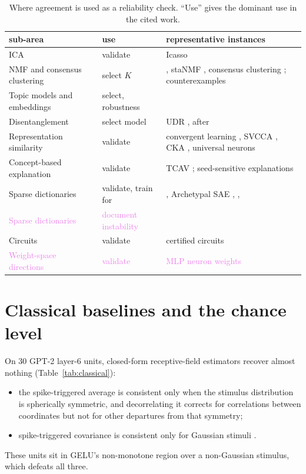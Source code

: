 \documentclass[10pt]{article}
\newcommand{\draft}[1]{\textcolor{violet}{#1}}
\begin{document}
\begin{table}[h]
\centering
\scriptsize
\begin{tabular}{p{3.7cm}p{2.1cm}p{7.6cm}}
\toprule
sub-area & use & representative instances \\
\midrule
ICA & validate & Icasso \citep{himberg2004icasso} \\
NMF and consensus clustering & select $K$ & \citet{brunet2004metagenes}, staNMF
\citep{wu2016stanmf}, consensus clustering \citep{monti2003consensus}; counterexamples
\citep{kotliar2019cnmf,senbabaoglu2014critical} \\
Topic models and embeddings & select, robustness & \citet{greene2014topics,antoniak2018stability} \\
Disentanglement & select model & UDR \citep{duan2020udr}, after \citet{locatello2019challenging} \\
Representation similarity & validate & convergent learning \citep{li2016convergent}, SVCCA
\citep{raghu2017svcca}, CKA \citep{kornblith2019cka}, universal neurons
\citep{gurnee2024universal} \\
Concept-based explanation & validate & TCAV \citep{kim2018tcav}; seed-sensitive
explanations \citep{madhyastha2019stability} \\
Sparse dictionaries & validate, train for & \citet{sharkey2022interim,bricken2023monosemanticity},
Archetypal SAE \citep{fel2025archetypal}, \citet{song2025position}, \draft{\citet{chen2025taming}} \\
\draft{Sparse dictionaries} & \draft{document instability} & \draft{\citet{paulo2025sparse,gerasimov2026unstable}} \\
Circuits & validate & certified circuits \citep{anani2026certified} \\
\draft{Weight-space directions} & \draft{validate} & \draft{MLP neuron weights \citep{avrahamy2026rotate}} \\
\bottomrule
\end{tabular}
\caption{Where agreement is used as a reliability check. ``Use'' gives the dominant use in the
cited work.}
\label{tab:census}
\end{table}

\FloatBarrier
\section{Classical baselines and the chance level}
\label{app:baselines}
On 30 GPT-2 layer-6 units, closed-form receptive-field estimators recover almost nothing
(Table~\ref{tab:classical}):
\begin{itemize}
  \item the spike-triggered average is consistent only when the stimulus distribution is
  spherically symmetric, and decorrelating it corrects for correlations between coordinates but
  not for other departures from that symmetry;
  \item spike-triggered covariance is consistent only for Gaussian stimuli
  \citep{paninski2003convergence}.
\end{itemize}
These units sit in GELU's non-monotone region over a non-Gaussian stimulus, which defeats all
three.
\end{document}
